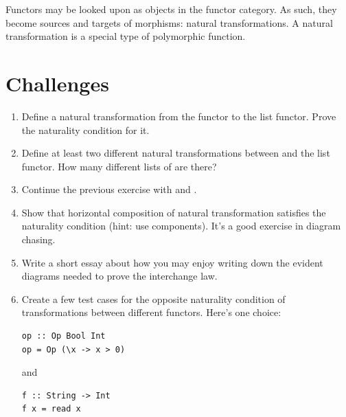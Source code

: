 Functors may be looked upon as objects in the functor category. As such,
they become sources and targets of morphisms: natural transformations. A
natural transformation is a special type of polymorphic function.

\section{Challenges}\label{challenges}

\begin{enumerate}
\tightlist
\item
  Define a natural transformation from the  functor to the
  list functor. Prove the naturality condition for it.
\item
  Define at least two different natural transformations between
   and the list functor. How many different lists of
  \code{()} are there?
\item
  Continue the previous exercise with  and
  .
\item
  Show that horizontal composition of natural transformation satisfies
  the naturality condition (hint: use components). It's a good exercise
  in diagram chasing.
\item
  Write a short essay about how you may enjoy writing down the evident
  diagrams needed to prove the interchange law.
\item
  Create a few test cases for the opposite naturality condition of
  transformations between different  functors. Here's one
  choice:

\begin{Verbatim}
op :: Op Bool Int
op = Op (\x -> x > 0)
\end{Verbatim}
and

\begin{Verbatim}[commandchars=\\\{\}]
f :: String -> Int
f x = read x
\end{Verbatim}
\end{enumerate}

